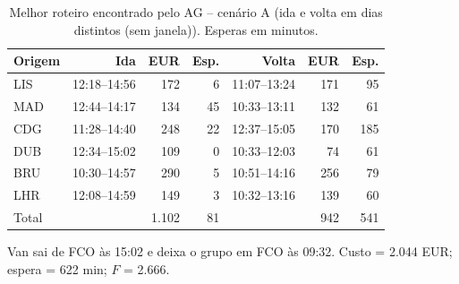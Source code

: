 \begin{table}[!t]
\centering
\footnotesize
\setlength{\tabcolsep}{3.5pt}
\caption{Melhor roteiro encontrado pelo AG -- cenário A (ida e volta em dias distintos (sem janela)). Esperas em minutos.}
\label{tab:a1_best_A}
\begin{tabular}{@{}lrrrrrr@{}}
\toprule
Origem & Ida & EUR & Esp. & Volta & EUR & Esp. \\
\midrule
LIS & 12:18--14:56 & 172 & 6 & 11:07--13:24 & 171 & 95 \\
MAD & 12:44--14:17 & 134 & 45 & 10:33--13:11 & 132 & 61 \\
CDG & 11:28--14:40 & 248 & 22 & 12:37--15:05 & 170 & 185 \\
DUB & 12:34--15:02 & 109 & 0 & 10:33--12:03 & 74 & 61 \\
BRU & 10:30--14:57 & 290 & 5 & 10:51--14:16 & 256 & 79 \\
LHR & 12:08--14:59 & 149 & 3 & 10:32--13:16 & 139 & 60 \\
\midrule
Total &  & 1.102 & 81 &  & 942 & 541 \\
\bottomrule
\end{tabular}
\par\smallskip\parbox{0.95\linewidth}{\scriptsize Van sai de FCO às 15:02 e deixa o grupo em FCO às 09:32. Custo = 2.044 EUR; espera = 622 min; $F$ = 2.666.}
\end{table}
